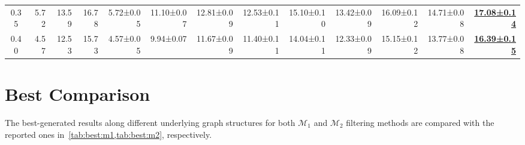 \documentclass[a4paper,10pt,conference]{IEEEtran}
\begin{document}
\begin{table*}[ht]
{\begin{tabular}{@{}crrrrrrrrrrrr@{}}
			0.35        & 5.72                                       & 13.59                                                                    & 16.78                                 & 5.72±0.05                     & 11.10±0.07                            & 12.81±0.09                            & 12.53±0.11                            & 15.10±0.10                            & 13.42±0.09                            & 16.09±0.12                            & 14.71±0.08                            & \underline{\textbf{17.08±0.14}}       \\
			0.40        & 4.57                                       & 12.53                                                                    & 15.73                                 & 4.57±0.05                     & 9.94±0.07                             & 11.67±0.09                            & 11.40±0.11                            & 14.04±0.11                            & 12.33±0.09                            & 15.15±0.12                            & 13.77±0.08                            & \underline{\textbf{16.39±0.15}}       \\
			\bottomrule
		\end{tabular}
	}
\end{table*}

\section{Best Comparison}
The best-generated results along different underlying graph structures for both \(\mathcal{M}_1\) and \(\mathcal{M}_2\) filtering methods are compared with the reported ones in~\cref{tab:best:m1,tab:best:m2}, respectively.
\end{document}
